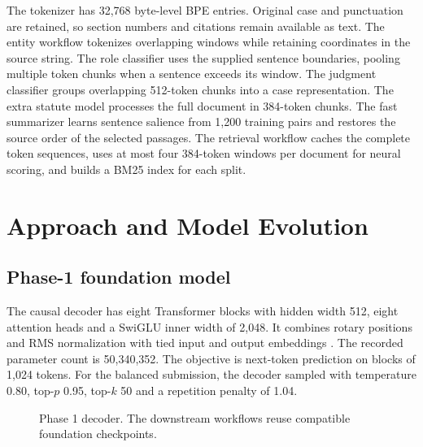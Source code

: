 \documentclass[11pt, oneside]{article}
\begin{document}
The tokenizer has 32,768 byte-level BPE entries. Original case and punctuation are retained, so section numbers and citations remain available as text. The entity workflow tokenizes overlapping windows while retaining coordinates in the source string. The role classifier uses the supplied sentence boundaries, pooling multiple token chunks when a sentence exceeds its window. The judgment classifier groups overlapping 512-token chunks into a case representation. The extra statute model processes the full document in 384-token chunks. The fast summarizer learns sentence salience from 1,200 training pairs and restores the source order of the selected passages. The retrieval workflow caches the complete token sequences, uses at most four 384-token windows per document for neural scoring, and builds a BM25 index for each split.

\section{Approach and Model Evolution}
\subsection{Phase-1 foundation model}

The causal decoder has eight Transformer blocks with hidden width 512, eight attention heads and a SwiGLU inner width of 2,048. It combines rotary positions and RMS normalization with tied input and output embeddings \citep{vaswani,rope,rmsnorm,swiglu}. The recorded parameter count is 50,340,352. The objective is next-token prediction on blocks of 1,024 tokens. For the balanced submission, the decoder sampled with temperature 0.80, top-$p$ 0.95, top-$k$ 50 and a repetition penalty of 1.04.

\begin{figure}[H]
\centering
{}
\caption{Phase 1 decoder. The downstream workflows reuse compatible foundation checkpoints.}
\end{figure}
\end{document}
